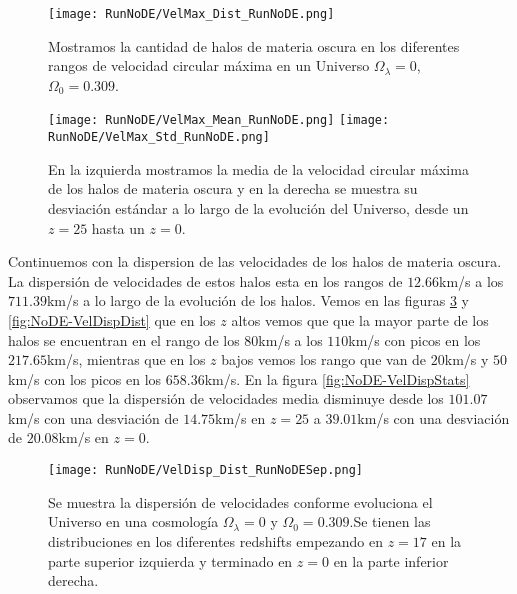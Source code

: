 \begin{figure}[H]
    \centering
    \texttt{[image: RunNoDE/VelMax\_Dist\_RunNoDE.png]}
    \caption[Distribución de la velocidad circular máxima de un Universo $\Omega_\lambda = 0$, $\Omega_0 = 0.309$]{\footnotesize Mostramos la cantidad de halos de materia oscura en los diferentes rangos de velocidad circular máxima en un Universo $\Omega_\lambda = 0$, $\Omega_0 = 0.309$.}
    \label{fig:NoDE-VelMaxDist}
\end{figure}

\begin{figure}[H]
    \centering
    \texttt{[image: RunNoDE/VelMax\_Mean\_RunNoDE.png]}
    \texttt{[image: RunNoDE/VelMax\_Std\_RunNoDE.png]}
    \caption[Media y desviación estándar de la velocidad circular máxima de un Universo $\Omega_\lambda = 0$, $\Omega_0 = 0.309$]{\footnotesize En la izquierda mostramos la media de la velocidad circular máxima de los halos de materia oscura y en la derecha se muestra su desviación estándar a lo largo de la evolución del Universo, desde un $z=25$ hasta un $z=0$.}
    \label{fig:NoDE-VelMaxStats}
\end{figure}

Continuemos con la dispersion de las velocidades de los halos de materia oscura. La dispersión de velocidades de estos halos esta en los rangos de $12.66$km/s a los $711.39$km/s a lo largo de la evolución de los halos. Vemos en las figuras \ref{fig:NoDE-VelDispDistSep} y \ref{fig:NoDE-VelDispDist} que en los $z$ altos vemos que que la mayor parte de los halos se encuentran en el rango de los $80$km/s a los $110$km/s con picos en los $217.65$km/s, mientras que en los $z$ bajos vemos los rango que van de $20$km/s y $50$km/s con los picos en los $658.36$km/s. En la figura \ref{fig:NoDE-VelDispStats} observamos que la dispersión de velocidades media disminuye desde los $101.07$km/s con una desviación de $14.75$km/s en $z=25$ a $39.01$km/s con una desviación de $20.08$km/s en $z=0$.

\begin{figure}[H]
    \centering
    \texttt{[image: RunNoDE/VelDisp\_Dist\_RunNoDESep.png]}
    \caption[Dispersión de velocidades en la evolución de un Universo $\Omega_\lambda = 0$, $\Omega_0 = 0.309$]{\footnotesize Se muestra la dispersión de velocidades conforme evoluciona el Universo en una cosmología $\Omega_\lambda = 0$ y $\Omega_0 = 0.309$.Se tienen las distribuciones en los diferentes redshifts empezando en $z=17$ en la parte superior izquierda y terminado en $z=0$ en la parte inferior derecha.}
    \label{fig:NoDE-VelDispDistSep}
\end{figure}


